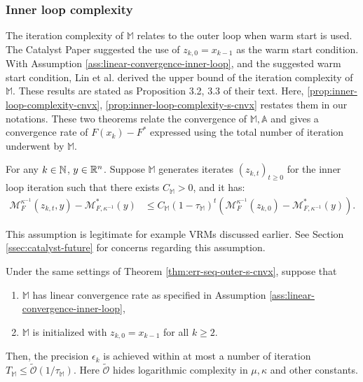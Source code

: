 \documentclass[12pt]{article}
\begin{document}
        \subsubsection{Inner loop complexity}
            The iteration complexity of $\mathbb M$ relates to the outer loop when warm start is used. 
            The Catalyst Paper \cite{lin_universal_2015} suggested the use of $z_{k, 0} = x_{k - 1}$ as the warm start condition. 
            With Assumption \ref{ass:linear-convergence-inner-loop}, and the suggested warm start condition,  Lin et al. derived the upper bound of the iteration complexity of $\mathbb M$.
            These results are stated as Proposition 3.2, 3.3 of their text.
            Here, \ref{prop:inner-loop-complexity-cnvx}, \ref{prop:inner-loop-complexity-s-cnvx} restates them in our notations. 
            These two theorems relate the convergence of $\mathbb M, \mathbb A$ and gives a convergence rate of $F(x_k) - F^*$ expressed using the total number of iteration underwent by $\mathbb M$. 
            \begin{assumption}\label{ass:linear-convergence-inner-loop}
                For any $k \in \mathbb N$, $y \in \mathbb R^n$. 
                Suppose $\mathbb M$ generates iterates $(z_{k, t})_{t \ge 0}$ for the inner loop iteration such that there exists $C_{\mathbb M} > 0$, and it has: 
                \begin{align*}
                    \mathcal M_F^{\kappa^{-1}}(z_{k, t}, y) - \mathcal M^*_{F, \kappa^{-1}}(y) 
                    &\le 
                    C_{\mathbb M}(1 - \tau_{\mathbb M})^t
                    \left(
                        \mathcal M_{F}^{\kappa^{-1}}(z_{k,0})
                        -
                        \mathcal M^*_{F, \kappa^{-1}}(y)
                    \right). 
                \end{align*}
            \end{assumption}
            \begin{remark}
                This assumption is legitimate for example VRMs discussed earlier. 
                See Section \ref{ssec:catalyst-future} for concerns regarding this assumption. 
            \end{remark}
            \begin{proposition}\label{prop:inner-loop-complexity-s-cnvx}
                Under the same settings of Theorem \ref{thm:err-seq-outer-s-cnvx}, suppose that 
                \begin{enumerate}
                    \item $\mathbb M$ has linear convergence rate as specified in Assumption \ref{ass:linear-convergence-inner-loop}, 
                    \item $\mathbb M$ is initialized with  $z_{k, 0} = x_{k - 1}$ for all $k \ge 2$. 
                \end{enumerate}
                Then, the precision $\epsilon_k$ is achieved within at most a number of iteration $T_{\mathbb M} \le \widetilde {\mathcal O}(1/ \tau_{\mathbb M})$. 
                Here $\widetilde{\mathcal O}$ hides logarithmic complexity in $\mu, \kappa$ and other constants. 
            \end{proposition}
\end{document}
